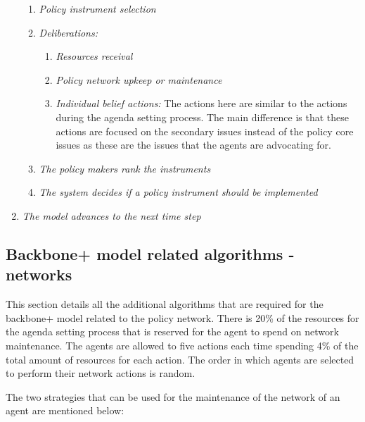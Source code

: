 \begin{enumerate}
\begin{enumerate}
	\item \emph{Policy instrument selection}
	\item \emph{Deliberations:}
		\begin{enumerate}
		\item \emph{Resources receival}
		\item \emph{Policy network upkeep or maintenance}
		\item \emph{Individual belief actions:} The actions here are similar to the actions during the agenda setting process. The main difference is that these actions are focused on the secondary issues instead of the policy core issues as these are the issues that the agents are advocating for.
		\end{enumerate}
	\item \emph{The policy makers rank the instruments}
	\item \emph{The system decides if a policy instrument should be implemented}
	\end{enumerate}
\item \emph{The model advances to the next time step}
\end{enumerate}

\subsection{Backbone+ model related algorithms - networks}

This section details all the additional algorithms that are required for the backbone+ model related to the policy network. There is 20\% of the resources for the agenda setting process that is reserved for the agent to spend on network maintenance. The agents are allowed to five actions each time spending 4\% of the total amount of resources for each action. The order in which agents are selected to perform their network actions is random.

The two strategies that can be used for the maintenance of the network of an agent are mentioned below:

